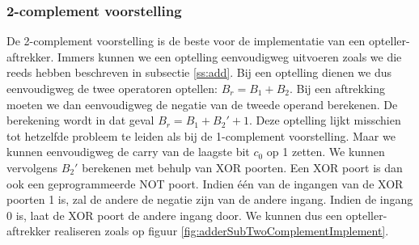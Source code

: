 \subsubsection{2-complement voorstelling}
De 2-complement voorstelling is de beste voor de implementatie van een opteller-aftrekker. Immers kunnen we een optelling eenvoudigweg uitvoeren zoals we die reeds hebben beschreven in subsectie \ref{ss:add}. Bij een optelling dienen we dus eenvoudigweg de twee operatoren optellen: $B_r=B_1+B_2$. Bij een aftrekking moeten we dan eenvoudigweg de negatie van de tweede operand berekenen. De berekening wordt in dat geval $B_r=B_1+B_2'+1$. Deze optelling lijkt misschien tot hetzelfde probleem te leiden als bij de 1-complement voorstelling. Maar we kunnen eenvoudigweg de carry van de laagste bit $c_0$ op 1 zetten. We kunnen vervolgens $B_2'$ berekenen met behulp van XOR poorten. Een XOR poort is dan ook een geprogrammeerde NOT poort. Indien \'e\'en van de ingangen van de XOR poorten 1 is, zal de andere de negatie zijn van de andere ingang. Indien de ingang 0 is, laat de XOR poort de andere ingang door. We kunnen dus een opteller-aftrekker realiseren zoals op figuur \ref{fig:adderSubTwoComplementImplement}.
